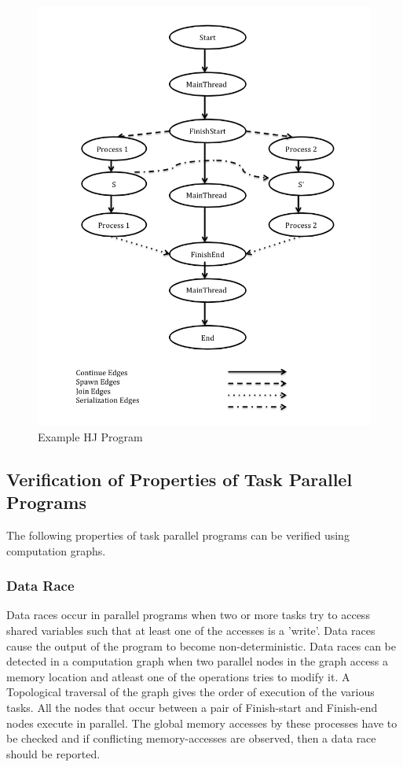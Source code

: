 \begin{figure}[h!]
  \caption{Example HJ Program}
    \includegraphics[scale=0.5]{../figs/Fig2.jpg}
\end{figure}
\subsection{Verification of Properties of Task Parallel Programs}
The following properties of task parallel programs can be verified using computation graphs.
\subsubsection{Data Race}
Data races occur in parallel programs when two or more tasks try to access shared variables such that at least one of the accesses is a 'write'. Data races cause the output of the program to become non-deterministic. Data races can be detected in a computation graph when two parallel nodes in the graph access a memory location and atleast one of the operations tries to modify it. A Topological traversal of the graph gives the order of execution of the various tasks. All the nodes that occur between  a pair of Finish-start and Finish-end nodes execute in parallel. The global memory accesses by these processes have to be checked and if conflicting memory-accesses are observed, then a data race should be reported.
